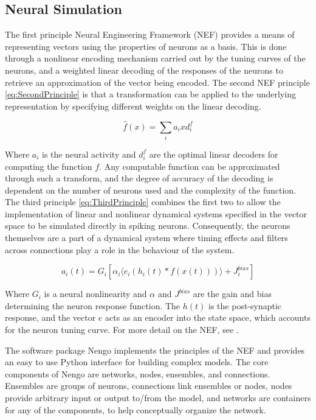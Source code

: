 \documentclass[letterpaper, 10 pt, conference]{ieeeconf}  %
\begin{document}
\subsection{Neural Simulation}

The first principle Neural Engineering Framework (NEF)\cite{eliasmith2004neural} provides a means of representing vectors using the properties of neurons as a basis.
This is done through a nonlinear encoding mechanism carried out by the tuning curves of the neurons, and a weighted linear decoding of the responses of the neurons to retrieve an approximation of the vector being encoded.
The second NEF principle \eqref{eq:SecondPrinciple} is that a transformation can be applied to the underlying representation by specifying different weights on the linear decoding.%

\begin{equation} \label{eq:SecondPrinciple}
\hat{f}(x) = \sum_{i} a_{i} x d_{i}^{f}
\end{equation}

Where $a_{i}$ is the neural activity and $d_{i}^{f}$ are the optimal linear decoders for computing the function $f$.
Any computable function can be approximated through such a transform, and the degree of accuracy of the decoding is dependent on the number of neurons used and the complexity of the function.
The third principle \eqref{eq:ThirdPrinciple} combines the first two to allow the implementation of linear and nonlinear dynamical systems specified in the vector space to be simulated directly in spiking neurons.
Consequently, the neurons themselves are a part of a dynamical system where timing effects and filters across connections play a role in the behaviour of the system.%

\begin{equation} \label{eq:ThirdPrinciple}
a_i(t) = G_i [ \alpha_i \langle e_i ( h_i(t)  * f(x(t)) ) \rangle + J^{bias}_i ]
\end{equation}

Where $G_{i}$ is a neural nonlinearity and $\alpha$ and $J^{bias}$ are the gain and bias determining the neuron response function. The $h(t)$ is the post-synaptic response, and the vector $e$ acts as an encoder into the state space, which accounts for the neuron tuning curve.
For more detail on the NEF, see \cite{eliasmith2004neural}.%

The software package Nengo \cite{bekolay2013nengo} implements the principles of the NEF and provides an easy to use Python interface for building complex models.
The core components of Nengo are networks, nodes, ensembles, and connections.
Ensembles are groups of neurons, connections link ensembles or nodes, nodes provide arbitrary input or output to/from the model, and networks are containers for any of the components, to help conceptually organize the network.
\end{document}
